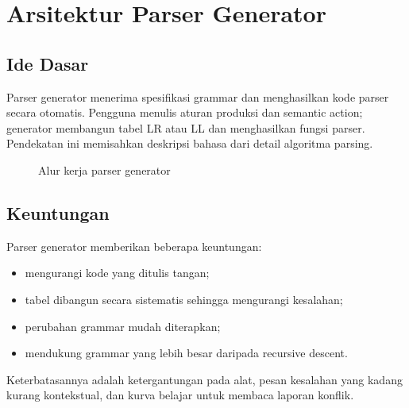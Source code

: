 \section{Arsitektur Parser Generator}
\label{sec:ch13-arsitektur}

\subsection{Ide Dasar}

Parser generator menerima spesifikasi grammar dan menghasilkan kode
parser secara otomatis. Pengguna menulis aturan produksi dan
semantic action; generator membangun tabel LR atau LL dan menghasilkan
fungsi parser. Pendekatan ini memisahkan deskripsi bahasa dari
detail algoritma parsing.

\begin{figure}[H]
\centering
{}
\caption{Alur kerja parser generator}
\label{fig:ch13-arsitektur}
\end{figure}

\subsection{Keuntungan}

Parser generator memberikan beberapa keuntungan:
\begin{itemize}[leftmargin=*]
  \item mengurangi kode yang ditulis tangan;
  \item tabel dibangun secara sistematis sehingga mengurangi kesalahan;
  \item perubahan grammar mudah diterapkan;
  \item mendukung grammar yang lebih besar daripada recursive descent.
\end{itemize}

Keterbatasannya adalah ketergantungan pada alat, pesan kesalahan yang
kadang kurang kontekstual, dan kurva belajar untuk membaca laporan
konflik.

